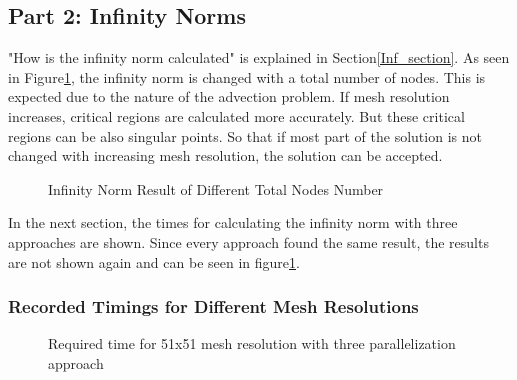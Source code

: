 \documentclass{article}
\begin{document}
\clearpage
\subsection{Part 2: Infinity Norms}
"How is the infinity norm calculated" is explained in Section\ref{Inf_section}. As seen in Figure\ref{inf_result}, the infinity norm is changed with a total number of nodes. This is expected due to the nature of the advection problem. If mesh resolution increases, critical regions are calculated more accurately. But these critical regions can be also singular points. So that if most part of the solution is not changed with increasing mesh resolution, the solution can be accepted.

\begin{figure}[hbt!]
  \centering
{}
  \caption{Infinity Norm Result of Different Total Nodes Number}
  \label{inf_result}
\end{figure}


In the next section, the times for calculating the infinity norm with three approaches are shown. Since every approach found the same result, the results are not shown again and can be seen in figure\ref{inf_result}. 

\clearpage
\subsubsection{Recorded Timings for Different Mesh Resolutions}

\begin{figure}[hbt!]
  \centering
{}
  \caption{Required time for 51x51 mesh resolution with three parallelization approach}
  \label{inf_result_051}
\end{figure}
\end{document}
